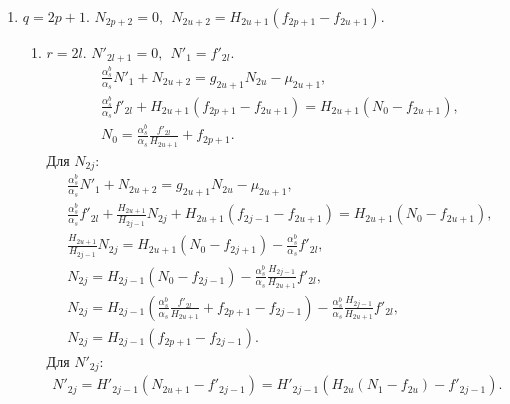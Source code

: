 \begin{enumerate}
\begin{enumerate}
        \item \(q=2p+1\). \(N_{2p+2} = 0, ~~ N_{2u+2} = H_{2u+1} (f_{2p+1} - f_{2u+1}) \).
        \begin{enumerate}
            \item \(r=2l\). \(N'_{2l+1} = 0, ~~ N'_1 = f'_{2l}\).
            \begin{equation*}
                \begin{split}
                    & \frac{\alpha^b_s}{\alpha_s} N'_1 + N_{2u+2} = g_{2u+1} N_{2u} - \mu_{2u+1}, \\
                    & \frac{\alpha^b_s}{\alpha_s} f'_{2l} + H_{2u+1} (f_{2p+1} - f_{2u+1}) = H_{2u+1} (N_0 - f_{2u+1}), \\
                    & N_0 = \frac{\alpha^b_s}{\alpha_s} \frac{f'_{2l}}{H_{2u+1}} + f_{2p+1}.
                \end{split}
            \end{equation*}
            Для \(N_{2j}\):
            \begin{equation*}
                \begin{split}
                    & \frac{\alpha^b_s}{\alpha_s} N'_1 + N_{2u+2} = g_{2u+1} N_{2u} - \mu_{2u+1}, \\
                    & \frac{\alpha^b_s}{\alpha_s} f'_{2l} + \frac{H_{2u+1}}{H_{2j-1}} N_{2j} + H_{2u+1} (f_{2j-1} - f_{2u+1}) = H_{2u+1} (N_0 - f_{2u+1}), \\
                    & \frac{H_{2u+1}}{H_{2j-1}} N_{2j} = H_{2u+1} ( N_0 - f_{2j+1} ) - \frac{\alpha^b_s}{\alpha_s} f'_{2l}, \\
                    & N_{2j} = H_{2j-1} ( N_0 - f_{2j-1} ) - \frac{\alpha^b_s}{\alpha_s} \frac{H_{2j-1}}{H_{2u+1}} f'_{2l}, \\
                    & N_{2j} = H_{2j-1} \left( \frac{\alpha^b_s}{\alpha_s} \frac{f'_{2l}}{H_{2u+1}} + f_{2p+1} - f_{2j-1} \right) - \frac{\alpha^b_s}{\alpha_s} \frac{H_{2j-1}}{H_{2u+1}} f'_{2l}, \\
                    & N_{2j} = H_{2j-1} (f_{2p+1} - f_{2j-1}).
                \end{split}
            \end{equation*}
            Для \(N'_{2j}\):
            \begin{equation*}
                \begin{split}
                    N'_{2j} = H'_{2j-1} (N_{2u+1} - f'_{2j-1}) = H'_{2j-1} ( H_{2u} (N_1 - f_{2u}) - f'_{2j-1}).
                \end{split}
            \end{equation*}


\end{enumerate}
\end{enumerate}
\end{enumerate}
